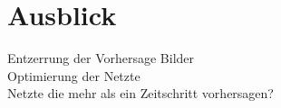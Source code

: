 \section{Ausblick}
Entzerrung der Vorhersage Bilder\\
Optimierung der Netzte\\
Netzte die mehr als ein Zeitschritt vorhersagen?\\

